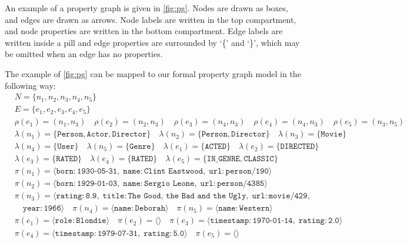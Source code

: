 \documentclass{report}
\theoremstyle{definition}
\begin{document}
An example of a property graph is given in \autoref{fig:pg}. Nodes are drawn as boxes, and edges are drawn as arrows. Node labels are written in the top compartment, and node properties are written in the bottom compartment. Edge labels are written inside a pill and edge properties are surrounded by `\{' and `\}', which may be omitted when an edge has no properties.

The example of \autoref{fig:pg} can be mapped to our formal property graph model in the following way:
\begin{align*}
  &N = \{n_1, n_2, n_3, n_4, n_5\}\\
  &E = \{e_1, e_2, e_3, e_4, e_5\}\\
  &\rho(e_1) = (n_1, n_3) \quad \rho(e_2) = (n_2, n_3) \quad \rho(e_3) = (n_4, n_3) \quad \rho(e_4) = (n_4, n_3) \quad \rho(e_5) = (n_3, n_5)\\
  &\lambda(n_1) = \{\texttt{Person}, \texttt{Actor}, \texttt{Director}\} \quad \lambda(n_2) = \{\texttt{Person}, \texttt{Director}\} \quad \lambda(n_3) = \{\texttt{Movie}\}\\
  &\lambda(n_4) = \{\texttt{User}\} \quad \lambda(n_5) = \{\texttt{Genre}\} \quad \lambda(e_1) = \{\texttt{ACTED}\} \quad \lambda(e_2) = \{\texttt{DIRECTED}\}\\
  &\lambda(e_3) = \{\texttt{RATED}\} \quad \lambda(e_4) = \{\texttt{RATED}\} \quad \lambda(e_5) = \{\texttt{IN\_GENRE}, \texttt{CLASSIC}\}\\
  &\pi(n_1) = \langle \texttt{born} : \texttt{1930-05-31},\;\texttt{name} : \texttt{Clint Eastwood},\;\texttt{url} : \texttt{person/190} \rangle\\
  &\pi(n_2) = \langle \texttt{born} : \texttt{1929-01-03},\;\texttt{name} : \texttt{Sergio Leone},\;\texttt{url} : \texttt{person/4385} \rangle\\
  &\pi(n_3) = \langle \texttt{rating} : \texttt{8.9},\;\texttt{title} : \texttt{The Good, the Bad and the Ugly},\;\texttt{url} : \texttt{movie/429},\\
  &\quad\texttt{year} : \texttt{1966} \rangle \quad \pi(n_4) = \langle \texttt{name} : \texttt{Deborah} \rangle \quad \pi(n_5) = \langle \texttt{name} : \texttt{Western} \rangle\\
  &\pi(e_1) = \langle \texttt{role} : \texttt{Blondie} \rangle \quad \pi(e_2) = \langle\rangle \quad \pi(e_3) = \langle \texttt{timestamp} : \texttt{1970-01-14},\;\texttt{rating} : \texttt{2.0}\rangle\\
  &\pi(e_4) = \langle \texttt{timestamp} : \texttt{1979-07-31},\;\texttt{rating} : \texttt{5.0}\rangle \quad \pi(e_5) = \langle\rangle
\end{align*}
\end{document}
